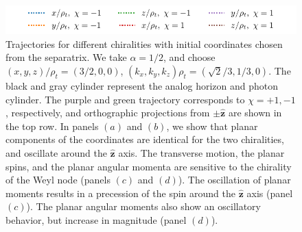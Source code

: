 \documentclass[submission, Phys]{SciPost}
\begin{document}
\begin{figure}[ht!]
    \includegraphics{fig/unstable_orbit_legend.pdf}
    \caption{Trajectories for different chiralities with initial coordinates chosen from the separatrix. We take $\alpha=1/2$, and choose $(x,y,z)/\rho_t=(3/2,0,0)$, $(k_x,k_y,k_z)\rho_t=(\sqrt2/3,1/3,0)$. The black and gray cylinder represent the analog horizon and photon cylinder. The purple and green trajectory corresponds to $\chi={+1,-1}$, respectively, and orthographic projections from $\pm\hat{\bm z}$ are shown in the top row. In panels $(a)$ and $(b)$, we show that planar components of the coordinates are identical for the two chiralities, and oscillate around the $\hat{\bm z}$ axis. The transverse motion, the planar spins, and the planar angular momenta are sensitive to the chirality of the Weyl node (panels $(c)$ and $(d)$). The oscillation of planar moments results in a precession of the spin around the $\hat{\bm z}$ axis (panel $(c)$). The planar angular moments also show an oscillatory behavior, but increase in magnitude (panel $(d)$).}
    \label{fig:photon_cylinder}
\end{figure}
\end{document}
